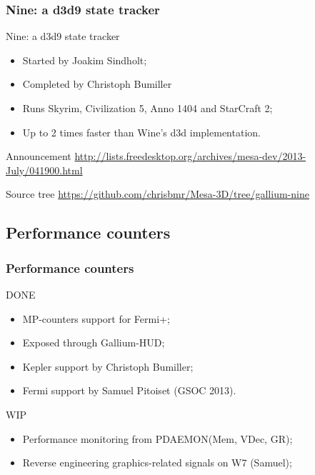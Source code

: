 \documentclass[11pt,english,compress]{beamer}
\begin{document}
\begin{frame}
	\frametitle{Nine: a d3d9 state tracker}

	\begin{block}{Nine: a d3d9 state tracker}
		\begin{itemize}
			\item Started by Joakim Sindholt;
			\item Completed by Christoph Bumiller
			\item Runs Skyrim, Civilization 5, Anno 1404 and StarCraft 2;
			\item Up to 2 times faster than Wine's d3d implementation.
		\end{itemize}
	\end{block}

	\begin{block}{Announcement}
		\url{http://lists.freedesktop.org/archives/mesa-dev/2013-July/041900.html}
	\end{block}

	\begin{block}{Source tree}
		\url{https://github.com/chrisbmr/Mesa-3D/tree/gallium-nine}
	\end{block}
\end{frame}

\subsection{Performance counters}

\begin{frame}
	\frametitle{Performance counters}

	\begin{block}{DONE}
		\begin{itemize}
			\item MP-counters support for Fermi+;
			\item Exposed through Gallium-HUD;
			\item Kepler support by Christoph Bumiller;
			\item Fermi support by Samuel Pitoiset (GSOC 2013).
		\end{itemize}
	\end{block}

	\begin{block}{WIP}
		\begin{itemize}
			\item Performance monitoring from PDAEMON(Mem, VDec,
GR);
			\item Reverse engineering graphics-related signals on
W7 (Samuel);
		\end{itemize}
	\end{block}

\end{frame}
\end{document}
